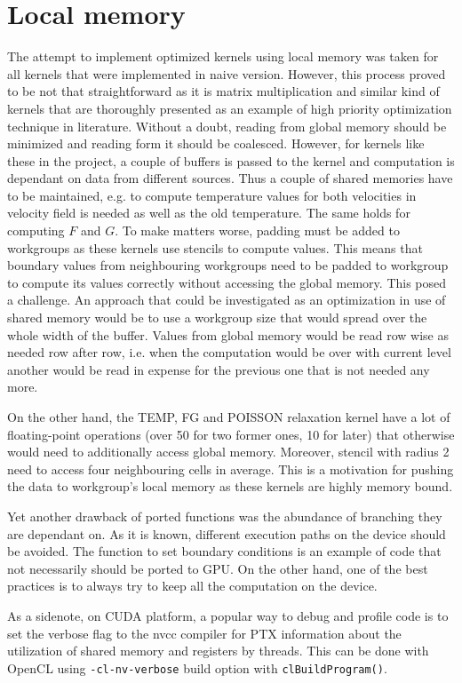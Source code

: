 \section{Local memory}
The attempt to implement optimized kernels using local memory was taken for all kernels that were implemented in naive version. However, this process proved to be not that straightforward as it is matrix multiplication and similar kind of kernels that are thoroughly presented as an example of high priority optimization technique in literature. Without a doubt, reading from global memory should be minimized and reading form it should be coalesced. However, for kernels like these in the project, a couple of buffers is passed to the kernel and computation is dependant on data from different sources. Thus a couple of shared memories have to be maintained, e.g. to compute temperature values for both velocities in velocity field is needed as well as the old temperature. The same holds for computing $F$ and $G$. To make matters worse, padding must be added to workgroups as these kernels use stencils to compute values. This means that boundary values from neighbouring workgroups need to be padded to workgroup to compute its values correctly without accessing the global memory. This posed a challenge. An approach that could be investigated as an optimization in use of shared memory would be to use a workgroup size that would spread over the whole width of the buffer. Values from global memory would be read row wise as needed row after row, i.e. when the computation would be over with current level another would be read in expense for the previous one that is not needed any more.

On the other hand, the TEMP, FG and POISSON relaxation kernel have a lot of floating-point operations (over 50 for two former ones, 10 for later) that otherwise would need to additionally access global memory. Moreover, stencil with radius 2 need to access four neighbouring cells in average. This is a motivation for pushing the data to workgroup's local memory as these kernels are highly memory bound.

Yet another drawback of ported functions was the abundance of branching they are dependant on. As it is known, different execution paths on the device should be avoided. The function to set boundary conditions is an example of code that not necessarily should be ported to GPU. On the other hand, one of the best practices is to always try to keep all the computation on the device.

As a sidenote, on CUDA platform, a popular way to debug and profile code is to set the verbose flag to the nvcc compiler for PTX information about the utilization of shared memory and registers by threads. This can be done with OpenCL using \texttt{-cl-nv-verbose} build option with \texttt{clBuildProgram()}.


